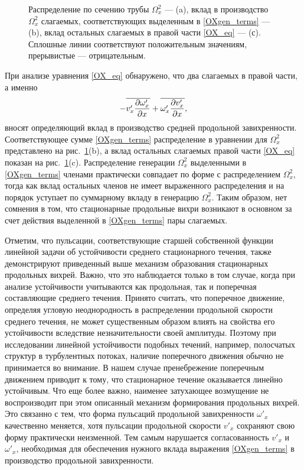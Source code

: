 \begin{figure}
\caption{Распределение по сечению трубы $\Omega_x^2$ --- (a), вклад в производство $\Omega_x^2$ слагаемых, соответствующих выделенным в \eqref{OXgen_terms} --- (b), вклад остальных слагаемых в правой части \eqref{OX_eq} --- (с). Сплошные линии соответствуют положительным значениям, прерывистые --- отрицательным.}
\label{OXgen_pic}
\end{figure}

При анализе уравнения \eqref{OX_eq} обнаружено, что два слагаемых в правой части, а именно
\begin{equation}\label{OXgen_terms}
 - \overline{v'_x \frac{\partial \omega'_x}{\partial x}} + \overline{ \omega'_x \frac{\partial v'_x}{\partial x} },
\end{equation}
вносят определяющий вклад в производство средней продольной завихренности. Соответствующее сумме \eqref{OXgen_terms}  распределение в уравнении для $\Omega_x^2$ представлено на рис.~\ref{OXgen_pic}(b), а вклад остальных слагаемых правой части \eqref{OX_eq} показан на рис.~\ref{OXgen_pic}(c). Распределение генерации $\Omega_x^2$ выделенными в \eqref{OXgen_terms} членами практически совпадает по форме с распределением $\Omega_x^2$, тогда как вклад остальных членов не имеет выраженного распределения и на порядок уступает по суммарному вкладу в генерацию $\Omega_x^2$. Таким образом, нет сомнения в том, что стационарные продольные вихри возникают в основном за счет действия выделенной в \eqref{OXgen_terms} пары слагаемых.

Отметим, что пульсации, соответствующие старшей собственной функции линейной задачи об устойчивости среднего стационарного течения, также демонстрируют приведенный выше механизм образования стационарных продольных вихрей. Важно, что это наблюдается только в том случае, когда при анализе устойчивости учитываются как продольная, так и поперечная составляющие среднего течения. Принято считать, что поперечное движение, определяя угловую неоднородность в распределении продольной скорости среднего течения, не может существенным образом влиять на свойства его устойчивости вследствие незначительности своей амплитуды. Поэтому при исследовании линейной устойчивости подобных течений, например, полосчатых структур в турбулентных потоках, наличие поперечного движения обычно не принимается во внимание. В нашем случае пренебрежение поперечным движением приводит к тому, что стационарное течение оказывается линейно устойчивым. Что еще более важно, наименее затухающее возмущение не воспроизводит при этом описанный механизм формирования продольных вихрей. Это связанно с тем, что форма пульсаций продольной завихренности $\omega'_x$ качественно меняется, хотя пульсации продольной скорости $v'_x$ сохраняют свою форму практически неизменной. Тем самым нарушается согласованность  $v'_x$ и $\omega'_x$, необходимая для обеспечения нужного вклада выражения \eqref{OXgen_terms} в производство продольной завихренности.

